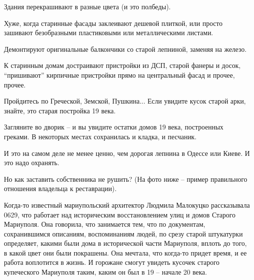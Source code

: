 
Здания перекрашивают в разные цвета (и это полбеды).


Хуже, когда старинные фасады заклеивают дешевой плиткой, или просто зашивают
безобразными пластиковыми или металлическими листами.


Демонтируют оригинальные балкончики со старой лепниной, заменяя на железо.


К старинным домам достраивают пристройки из ДСП, старой фанеры и досок,
\enquote{пришивают} кирпичные пристройки прямо на центральный фасад и прочее, прочее.


Пройдитесь по Греческой, Земской, Пушкина... Если увидите кусок старой арки, знайте, это старая постройка 19 века.


Загляните во дворик – и вы увидите остатки домов 19 века, построенных греками.
В некоторых местах сохранилась и кладка, и песчаник.


И это на самом деле не менее ценно, чем дорогая лепнина в Одессе или Киеве. И
это надо охранять. 

Но как заставить собственника не рушить? (На фото ниже – пример правильного
отношения владельца к реставрации).


Когда-то известный мариупольский архитектор Людмила Малокуцко рассказывала
0629, что работает над историческим восстановлением улиц и домов Старого
Мариуполя. Она говорила, что занимается тем, что по документам, сохранившимся
описаниям, воспоминаниям людей, по срезу старой штукатурки определяет, какими
были дома в исторической части Мариуполя, вплоть до того, в какой цвет они были
покрашены. Она мечтала, что когда-то придет время, и ее работа воплотится в
жизнь. И горожане смогут увидеть кусочек старого купеческого Мариуполя таким,
каким он был в 19 – начале 20 века.

